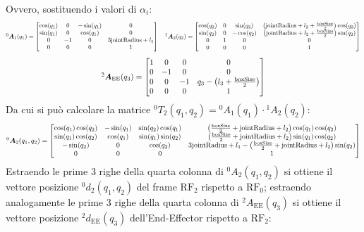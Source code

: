 \documentclass[11pt, a4paper]{report}
\begin{document}
Ovvero, sostituendo i valori di $\alpha_{i}$:
\[
\scalebox{0.75}{$
^{0}\bm{A}_{1}(q_{1}) =
\begin{bmatrix}
    \cos(q_1) & 0 & -\sin(q_1) & 0\\
    \sin(q_1) & 0 & \cos(q_1) & 0\\
    0 & -1 & 0 & 3\text{jointRadius} + l_{1}\\
    0 & 0 & 0 & 1
\end{bmatrix}
\quad
^{1}\bm{A}_{2}(q_{2}) =
\begin{bmatrix}
    \cos(q_2) & 0 & \sin(q_2) & \left(\text{jointRadius} + l_{2} + \frac{\text{boxSize}}{2}\right)\cos(q_{2})\\
    \sin(q_2) & 0 & -\cos(q_2) & \left(\text{jointRadius} + l_{2} + \frac{\text{boxSize}}{2}\right)\sin(q_{2})\\
    0 & 1 & 0 & 0\\
    0 & 0 & 0 & 1
\end{bmatrix}
$}
\]
\[
\scalebox{0.8}{$
^{2}\bm{A}_{\text{EE}}(q_{3}) =
\begin{bmatrix}
    1 & 0 & 0 & 0\\
    0 & -1 & 0 & 0\\
    0 & 0 & -1 & q_{3} - \left(l_{3} + \frac{\text{boxSize}}{2}\right)\\
    0 & 0 & 0 & 1
\end{bmatrix}
$}
\]
Da cui si può calcolare la matrice ${}^{0}T_{2}(q_{1}, q_{2}) = {}^{0}A_{1}(q_{1}) \cdot {}^{1}A_{2}(q_{2})$:
\[
\scalebox{0.8}{$
^{0}\bm{A}_{2}(q_{1}, q_{2}) =
\begin{bmatrix}
    \cos(q_1)\cos(q_2) & -\sin(q_1) & \sin(q_2)\cos(q_1) & \left(\frac{\text{boxSize}}{2} + \text{jointRadius} + l_2\right)\cos(q_1)\cos(q_2) \\
    \sin(q_1)\cos(q_2) & \cos(q_1) & \sin(q_1)\sin(q_2) & \left(\frac{\text{boxSize}}{2} + \text{jointRadius} + l_2\right)\sin(q_1)\cos(q_2) \\
    -\sin(q_2) & 0 & \cos(q_2) & 3\text{jointRadius} + l_1 - \left(\frac{\text{boxSize}}{2} + \text{jointRadius} + l_2\right)\sin(q_2) \\
    0 & 0 & 0 & 1
\end{bmatrix}
$}
\]
Estraendo le prime 3 righe della quarta colonna di ${}^{0}A_{2}(q_{1}, q_{2})$ si ottiene il vettore posizione ${}^{0}d_{2}(q_1, q_2)$ del frame $\text{RF}_2$ rispetto a $\text{RF}_0$; estraendo analogamente le prime 3 righe della quarta colonna di ${}^{2}A_{\text{EE}}(q_{3})$ si ottiene il vettore posizione ${}^{2}d_{\text{EE}}(q_3)$ dell'End-Effector rispetto a $\text{RF}_2$:
\end{document}
